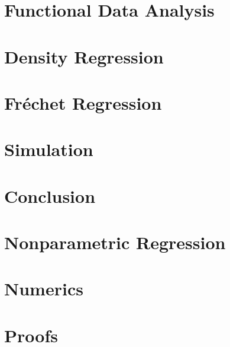 \documentclass[12pt, a4paper, bibtotoc, liststotoc]{scrartcl}
\begin{document}
\section{Functional Data Analysis}
\label{sec:fda}


\section{Density Regression}
\label{sec:density regression}


\section{Fréchet Regression}
\label{sec:fréchet regression}


\section{Simulation}
\label{sec:simulation}


\section{Conclusion}
\label{sec:conclusion}





\newpage
\appendix
{}

\section{Nonparametric Regression}
\label{sec:npregression}


\section{Numerics}
\label{sec:Numerics}


\section{Proofs}
\label{sec:proofs}



\newpage

\nocite{von_gaudecker_templates_2019}
\printbibliography
\end{document}
